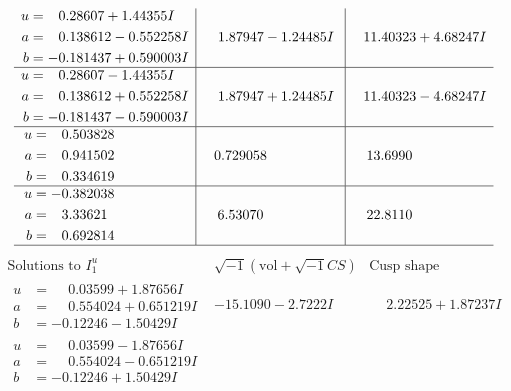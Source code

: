 \documentclass[1p]{elsarticle_modified}
\theoremstyle{definition}
\newcommand{\I}{\sqrt{-1}}
\begin{document}
$$\begin{array}{c|c|c}
\begin{aligned}
u &= \phantom{-}0.28607 + 1.44355 I \\
a &= \phantom{-}0.138612 - 0.552258 I \\
b &= -0.181437 + 0.590003 I\end{aligned}
 & \phantom{-}1.87947 - 1.24485 I & \phantom{-}11.40323 + 4.68247 I \\ \hline\begin{aligned}
u &= \phantom{-}0.28607 - 1.44355 I \\
a &= \phantom{-}0.138612 + 0.552258 I \\
b &= -0.181437 - 0.590003 I\end{aligned}
 & \phantom{-}1.87947 + 1.24485 I & \phantom{-}11.40323 - 4.68247 I \\ \hline\begin{aligned}
u &= \phantom{-}0.503828\phantom{ +0.000000I} \\
a &= \phantom{-}0.941502\phantom{ +0.000000I} \\
b &= \phantom{-}0.334619\phantom{ +0.000000I}\end{aligned}
 & \phantom{-}0.729058\phantom{ +0.000000I} & \phantom{-}13.6990\phantom{ +0.000000I} \\ \hline\begin{aligned}
u &= -0.382038\phantom{ +0.000000I} \\
a &= \phantom{-}3.33621\phantom{ +0.000000I} \\
b &= \phantom{-}0.692814\phantom{ +0.000000I}\end{aligned}
 & \phantom{-}6.53070\phantom{ +0.000000I} & \phantom{-}22.8110\phantom{ +0.000000I}\\
 \hline 
 \end{array}$$\newpage$$\begin{array}{c|c|c}  
\text{Solutions to }I^u_{1}& \I (\text{vol} + \sqrt{-1}CS) & \text{Cusp shape}\\
 \hline 
\begin{aligned}
u &= \phantom{-}0.03599 + 1.87656 I \\
a &= \phantom{-}0.554024 + 0.651219 I \\
b &= -0.12246 - 1.50429 I\end{aligned}
 & -15.1090 - 2.7222 I & \phantom{-}2.22525 + 1.87237 I \\ \hline\begin{aligned}
u &= \phantom{-}0.03599 - 1.87656 I \\
a &= \phantom{-}0.554024 - 0.651219 I \\
b &= -0.12246 + 1.50429 I\end{aligned}

\end{array}$$
\end{document}
